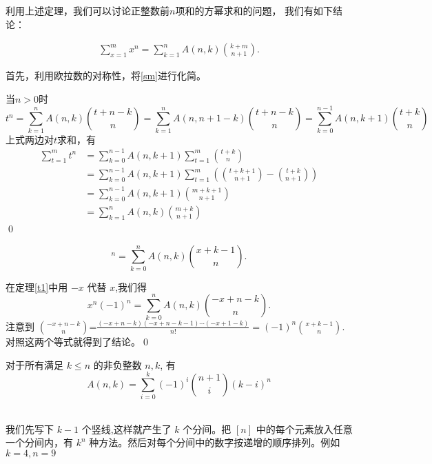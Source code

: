 利用上述定理，我们可以讨论正整数前$n$项和的方幂求和的问题，
我们有如下结论：

\begin{prop}
\begin{align}
\sum_{x=1}^mx^n=\sum_{k=1}^{n}A(n,k){k+m\choose n+1}.
\end{align}
\end{prop}

\pf 首先，利用欧拉数的对称性，将\eqref{sm}进行化简。

当$n>0$时 \[t^n=\sum_{k=1}^{n}A(n,k){t+n-k \choose
n}=\sum_{k=1}^{n}A(n,n+1-k){t+n-k \choose
n}=\sum_{k=0}^{n-1}A(n,k+1){t+k \choose n}
\]
上式两边对$t$求和，有
\begin{align*}
\sum_{t=1}^mt^n &=\sum_{k=0}^{n-1}A(n,k+1)\sum_{t=1}^m{t+k \choose n}\\
                &=\sum_{k=0}^{n-1}A(n,k+1)\sum_{t=1}^m \left({t+k+1\choose n+1}-{t+k\choose n+1}\right)\\
                &=\sum_{k=0}^{n-1}A(n,k+1){m+k+1\choose n+1}\\
                &=\sum_{k=1}^{n}A(n,k){m+k\choose n+1}
\end{align*}
\qed



\begin{coro}
\begin{equation}
[x]^n=\sum_{k=0}^{n}A(n,k){x+k-1\choose n}.
\end{equation}
\end{coro}
\pf
 在定理\ref{t1}中用 $-x$ 代替 $x$,我们得
 $$x^n(-1)^n=\sum_{k=0}^{n}A(n,k){-x+n-k\choose n}.$$
 注意到 ${-x+n-k \choose n}$=$\frac{(-x+n-k)(-x+n-k-1)\cdots
(-x+1-k)}{n!}=(-1)^n{x+k-1 \choose
 n}$. 对照这两个等式就得到了结论。\qed

\begin{thm}
对于所有满足 $k\leq n$ 的非负整数 $n,k$, 有
\begin{equation}
A(n,k)=\sum_{i=0}^{k}(-1)^i{n+1 \choose i}(k-i)^n
\end{equation}
\end{thm}

\\
我们先写下 $k-1$ 个竖线,这样就产生了 $k$ 个分间。把 $[n]$
中的每个元素放入任意一个分间内，有 $k^n$
种方法。然后对每个分间中的数字按递增的顺序排列。例如 $k=4,n=9$




